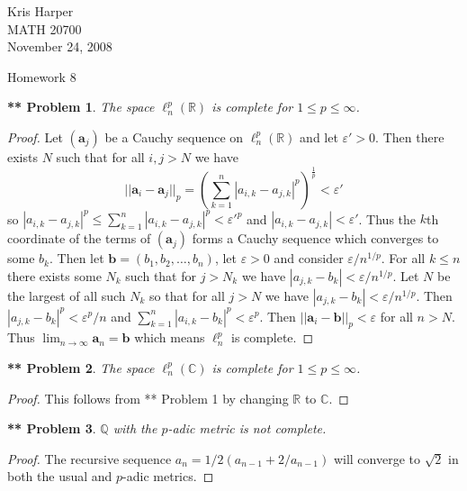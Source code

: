 \documentclass{article}
\newtheorem{**}{** Problem}
\begin{document}
\begin{flushright}
Kris Harper\\

MATH 20700\\

November 24, 2008
\end{flushright}

\begin{center}
Homework 8
\end{center}

\begin{flushleft}

\begin{**}
The space $\ell_n^p (\mathbb{R})$ is complete for $1 \leq p \leq \infty$.
\end{**}
\begin{proof}
Let $(\mathbf{a}_j)$ be a Cauchy sequence on $\ell_n^p (\mathbb{R})$ and let $\varepsilon' > 0$. Then there exists $N$ such that for all $i,j > N$ we have
\[
||\mathbf{a}_i - \mathbf{a}_j||_p = \left (\sum_{k=1}^{n} |a_{i,k}-a_{j,k}|^p \right )^{\frac{1}{p}} < \varepsilon'
\]
so $|a_{i,k}-a_{j,k}|^p \leq \sum_{k=1}^{n} |a_{i,k}-a_{j,k}|^p < \varepsilon'^p$ and $|a_{i,k}-a_{j,k}| < \varepsilon'$. Thus the $k$th coordinate of the terms of $(\mathbf{a}_j)$ forms a Cauchy sequence which converges to some $b_k$. Then let $\mathbf{b}=(b_1,b_2, \dots , b_n)$, let $\varepsilon > 0$ and consider $\varepsilon/n^{1/p}$. For all $k \leq n$ there exists some $N_k$ such that for $j > N_k$ we have $|a_{j,k}-b_{k}| < \varepsilon/n^{1/p}$. Let $N$ be the largest of all such $N_k$ so that for all $j>N$ we have $|a_{j,k}-b_{k}| < \varepsilon/n^{1/p}$. Then $|a_{j,k}-b_{k}|^p < \varepsilon^p/n$ and $\sum_{k=1}^{n} |a_{i,k}-b_{k}|^p < \varepsilon^p$. Then $||\mathbf{a}_i - \mathbf{b}||_p < \varepsilon$ for all $n > N$. Thus $\lim_{n \rightarrow \infty} \mathbf{a}_n = \mathbf{b}$ which means $\ell_n^p$ is complete.
\end{proof}

\begin{**}
The space $\ell_n^p (\mathbb{C})$ is complete for $1 \leq p \leq \infty$.
\end{**}
\begin{proof}
This follows from ** Problem 1 by changing $\mathbb{R}$ to $\mathbb{C}$.
\end{proof}

\begin{**}
$\mathbb{Q}$ with the $p$-adic metric is not complete.
\end{**}
\begin{proof}
The recursive sequence $a_n = 1/2(a_{n-1} + 2/a_{n-1})$ will converge to $\sqrt{2}$ in both the usual and $p$-adic metrics.
\end{proof}


\end{flushleft}
\end{document}
